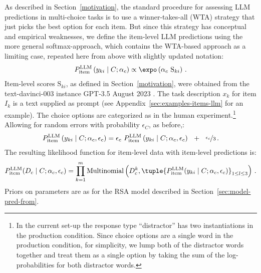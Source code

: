 \documentclass[fleqn]{article}
\begin{document}
As described in Section~\ref{motivation}, the standard procedure for assessing LLM predictions in multi-choice tasks is to use a winner-takes-all (WTA) strategy that just picks the best option for each item.
But since this strategy has conceptual and empirical weaknesses, we define the item-level LLM predictions using the more general softmax-approach, which contains the WTA-based approach as a limiting case, repeated here from above with slightly updated notation:
%
\begin{align*}
P_{\text{item}}^{\text{LLM}}\left ( y_{ki} \mid C; \alpha_{c} \right ) \propto \expo \left (\alpha_{c} \ \text{S}_{ki} \right)\,.
\end{align*}
%
Item-level scores $\text{S}_{ki}$, as defined in Section~\ref{motivation}, were obtained from the text-davinci-003 instance GPT-3.5 August 2023 \citep{BrownMann2020:Language-Models} .
The task description $x_{k}$ for item $I_{k}$ is a text supplied as prompt (see Appendix~\ref{sec:examples-items-llm} for an example).
The choice options are categorized as in the human experiment.\footnote{
  In the current set-up the response type ``distractor'' has two instantiations in the production condition. Since choice options are a single word in the production condition, for simplicity, we lump both of the distractor words together and treat them as a single option by taking the sum of the log-probabilities for both distractor words.}
Allowing for random errors with probability $\epsilon_{C}$, as before,:
%
\begin{align*}
  P_{\text{item}}^{\text{LLM}}\left ( y_{ki} \mid C; \alpha_{c}, \epsilon_{c} \right )
  = \epsilon_{c} \  P_{\text{item}}^{\text{LLM}}\left ( y_{ki} \mid C; \alpha_{c}, \epsilon_{c} \right ) \ \ + \ \ \nicefrac{\epsilon_{c}}{3}   \,.
\end{align*}
%
The resulting likelihood function for item-level data with item-level predictions is:
%
\begin{align*}
 P^{\text{LLM}}_{\text{item}}(D_{c} \mid C; \alpha_{c}, \epsilon_{c}) = \prod_{k = 1}^{m} \text{Multinomial} \left ( D_{c}^{k}, \tuple{P^{\text{LLM}}_{\text{item}}(y_{ki} \mid C;  \alpha_{c}, \epsilon_{c})}_{1 \le l \le 3} \right )\,.
\end{align*}
%
Priors on parameters are as for the RSA model described in Section~\ref{sec:model-pred-from}.
\end{document}
